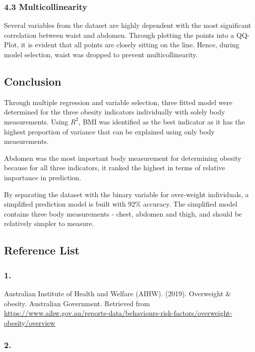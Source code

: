 \documentclass[a4paper,9pt,twocolumn,twoside,]{pinp}
\begin{document}
\hypertarget{multicollinearity}{%
\subsubsection{4.3 Multicollinearity}\label{multicollinearity}}

Several variables from the dataset are highly dependent with the most
significant correlation between waist and abdomen. Through plotting the
points into a QQ-Plot, it is evident that all points are closely sitting
on the line. Hence, during model selection, waist was dropped to prevent
multicollinearity.

\hypertarget{conclusion}{%
\subsection{Conclusion}\label{conclusion}}

Through multiple regression and variable selection, three fitted model
were determined for the three obesity indicators individually with
solely body measurements. Using \(R^2\), BMI was identified as the best
indicator as it has the highest proportion of variance that can be
explained using only body measurements.

Abdomen was the most important body measurement for determining obesity
because for all three indicators, it ranked the highest in terms of
relative importance in prediction.

By separating the dataset with the binary variable for over-weight
individuals, a simplified prediction model is built with 92\% accuracy.
The simplified model contains three body measurements - chest, abdomen
and thigh, and should be relatively simpler to measure.

\hypertarget{reference-list}{%
\subsection{Reference List}\label{reference-list}}

\hypertarget{section}{%
\subsubsection{1.}\label{section}}

Australian Institute of Health and Welfare (AIHW). (2019). Overweight \&
obesity. Australian Government. Retrieved from
\url{https://www.aihw.gov.au/reports-data/behaviours-risk-factors/overweight-obesity/overview}

\hypertarget{section-1}{%
\subsubsection{2.}\label{section-1}}
\end{document}
